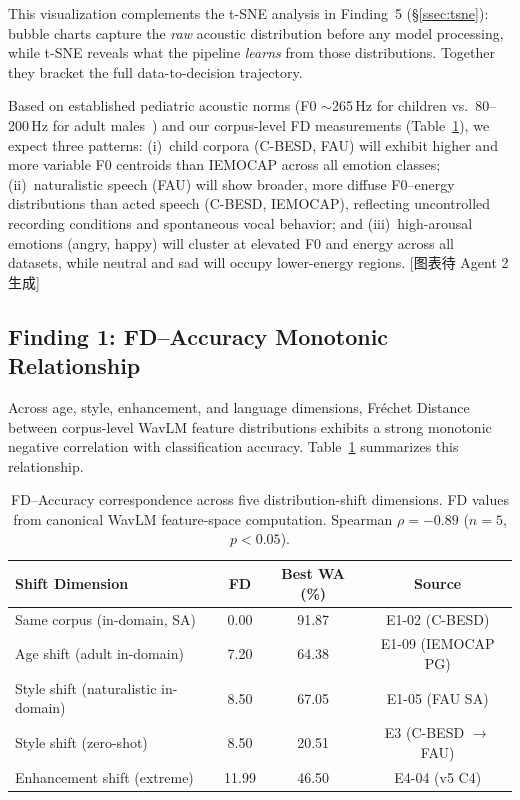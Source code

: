 \documentclass[11pt,a4paper]{article}
\begin{document}
This visualization complements the t-SNE analysis in Finding~5
(\S\ref{ssec:tsne}): bubble charts capture the \textit{raw} acoustic
distribution before any model processing, while t-SNE reveals what the
pipeline \textit{learns} from those distributions. Together they bracket the
full data-to-decision trajectory.

Based on established pediatric acoustic norms (F0 $\sim$265\,Hz for children
vs.\ 80--200\,Hz for adult males~\cite{ncvs2025normative}) and our
corpus-level FD measurements (Table~\ref{tab:fd_wa}), we expect three
patterns: (i)~child corpora (C-BESD, FAU) will exhibit higher and more
variable F0 centroids than IEMOCAP across all emotion classes;
(ii)~naturalistic speech (FAU) will show broader, more diffuse
F0--energy distributions than acted speech (C-BESD, IEMOCAP), reflecting
uncontrolled recording conditions and spontaneous vocal behavior; and
(iii)~high-arousal emotions (angry, happy) will cluster at elevated F0 and
energy across all datasets, while neutral and sad will occupy lower-energy
regions. [图表待 Agent 2 生成]

\subsection{Finding 1: FD--Accuracy Monotonic Relationship}

Across age, style, enhancement, and language dimensions, Fr\'{e}chet Distance
between corpus-level WavLM feature distributions exhibits a strong monotonic
negative correlation with classification accuracy.
Table~\ref{tab:fd_wa} summarizes this relationship.

\begin{table}[h]
\centering
\caption{FD--Accuracy correspondence across five distribution-shift dimensions. FD values from canonical WavLM feature-space computation. Spearman $\rho = -0.89$ ($n=5$, $p<0.05$).}
\label{tab:fd_wa}
\begin{tabular}{lccc}
\toprule
\textbf{Shift Dimension} & \textbf{FD} & \textbf{Best WA (\%)} & \textbf{Source} \\
\midrule
Same corpus (in-domain, SA)     & 0.00  & 91.87 & E1-02 (C-BESD) \\
Age shift (adult in-domain)     & 7.20  & 64.38 & E1-09 (IEMOCAP PG) \\
Style shift (naturalistic in-domain) & 8.50  & 67.05 & E1-05 (FAU SA) \\
Style shift (zero-shot)         & 8.50  & 20.51 & E3 (C-BESD $\rightarrow$ FAU) \\
Enhancement shift (extreme)     & 11.99 & 46.50 & E4-04 (v5 C4) \\
\bottomrule
\end{tabular}
\end{table}
\end{document}
